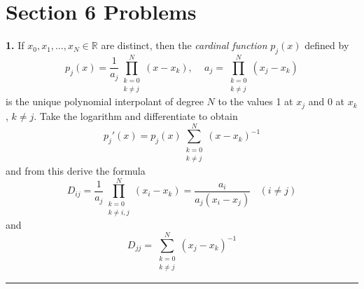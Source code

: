 \documentclass{article}
\begin{document}
\section*{Section 6 Problems}
\textbf{1.} If $x_0, x_1, \dots, x_N \in \mathbb{R}$ are distinct, then the \textit{cardinal function} $p_j(x)$ defined by 
\[p_j(x) = \frac{1}{a_j}\prod_{\substack{k=0\\k\neq j}}^N (x-x_k), \:\:\:\:\; a_j = \prod_{\substack{k=0\\ k\neq j}}^N (x_j - x_k)\]
is the unique polynomial interpolant of degree $N$ to the values 1 at $x_j$ and 0 at $x_k$, $k \neq j$. Take the logarithm and differentiate to obtain
\[p_j'(x) = p_j(x)\sum_{\substack{k=0\\ k\neq j}}^N (x - x_k)^{-1}\]
and from this derive the formula
\[D_{ij} = \frac{1}{a_j} \prod_{\substack{k=0\\ k\neq i,j}}^N(x_i - x_k) = \frac{a_i}{a_j(x_i - x_j)} \:\:\:\: (i \neq j)\]
and
\[D_{jj} = \sum_{\substack{k=0\\ k\neq j}}^N (x_j - x_k)^{-1}\]
\noindent\rule{12cm}{0.4pt}
\end{document}
